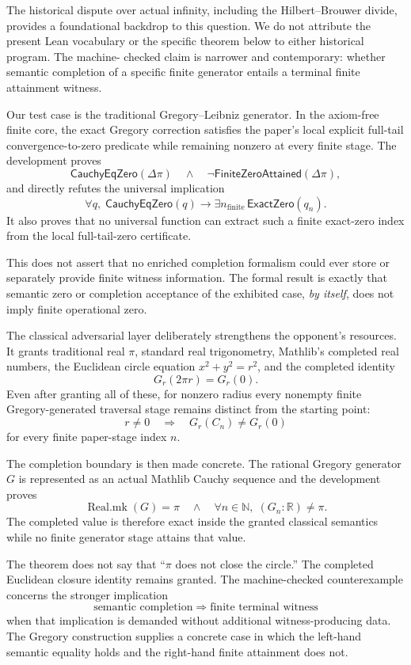 \documentclass[11pt,a4paper]{article}
\begin{document}
The historical dispute over actual infinity, including the
Hilbert--Brouwer divide, provides a foundational backdrop to this
question.  We do not attribute the present Lean vocabulary or the
specific theorem below to either historical program.  The machine-
checked claim is narrower and contemporary: whether semantic
completion of a specific finite generator entails a terminal finite
attainment witness.

Our test case is the traditional Gregory--Leibniz generator.  In the
axiom-free finite core, the exact Gregory correction satisfies the
paper's local explicit full-tail convergence-to-zero predicate while
remaining nonzero at every finite stage.  The development proves
\[
\mathsf{CauchyEqZero}(\Delta\pi)
\quad\land\quad
\neg\mathsf{FiniteZeroAttained}(\Delta\pi),
\]
and directly refutes the universal implication
\[
\forall q,\;
\mathsf{CauchyEqZero}(q)
\rightarrow
\exists n_{\mathrm{finite}}\,
\mathsf{ExactZero}(q_n).
\]
It also proves that no universal function can extract such a finite
exact-zero index from the local full-tail-zero certificate.

This does not assert that no enriched completion formalism could ever
store or separately provide finite witness information.  The formal
result is exactly that semantic zero or completion acceptance of the
exhibited case, \emph{by itself}, does not imply finite operational
zero.

The classical adversarial layer deliberately strengthens the
opponent's resources.  It grants traditional real \(\pi\), standard
real trigonometry, Mathlib's completed real numbers, the Euclidean
circle equation \(x^2+y^2=r^2\), and the completed identity
\[
G_r(2\pi r)=G_r(0).
\]
Even after granting all of these, for nonzero radius every nonempty
finite Gregory-generated traversal stage remains distinct from the
starting point:
\[
r\neq0
\quad\Longrightarrow\quad
G_r(C_n)\neq G_r(0)
\]
for every finite paper-stage index \(n\).

The completion boundary is then made concrete.  The rational Gregory
generator \(G\) is represented as an actual Mathlib Cauchy sequence and
the development proves
\[
\boxed{
\operatorname{Real.mk}(G)=\pi
\quad\land\quad
\forall n\in\mathbb N,\;(G_n:\mathbb R)\neq\pi.
}
\]
The completed value is therefore exact inside the granted classical
semantics while no finite generator stage attains that value.

The theorem does not say that ``\(\pi\) does not close the circle.''
The completed Euclidean closure identity remains granted.  The
machine-checked counterexample concerns the stronger implication
\[
\boxed{
\text{semantic completion}
\;\Longrightarrow\;
\text{finite terminal witness}
}
\]
when that implication is demanded without additional witness-producing
data.  The Gregory construction supplies a concrete case in which the
left-hand semantic equality holds and the right-hand finite attainment
does not.
\end{document}
